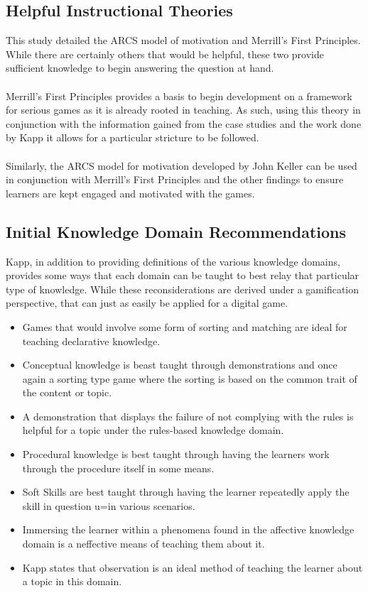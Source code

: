 \documentclass[conference]{IEEEtran}
\begin{document}
\subsection{Helpful Instructional Theories}
This study detailed the ARCS model of motivation and Merrill's First Principles. While there are certainly others that would be helpful, these two provide sufficient knowledge to begin answering the question at hand. 
\\\\
Merrill's First Principles\cite{Merrill2002} provides a basis to begin development on a framework for serious games as it is already rooted in teaching. As such, using this theory in conjunction with the information gained from the case studies and the work done by Kapp\cite{Kapp2012a} it allows for a particular stricture to be followed.
\\\\
Similarly, the ARCS model for motivation developed by John Keller\cite{keller1987development} can be used in conjunction with Merrill's First Principles and the other findings to ensure learners are kept engaged and motivated with the games.

\subsection{Initial Knowledge Domain Recommendations}
Kapp\cite{Kapp2012a}, in addition to providing definitions of the various knowledge domains, provides some ways that each domain can be taught to best relay that particular type of knowledge. While these reconsiderations are derived under a gamification perspective, that can just as easily be applied for a digital game.

\begin{itemize}
\item
Games that would involve some form of sorting and matching are ideal for teaching declarative knowledge\cite{Kapp2012a}.
\item
Conceptual knowledge is beast taught through demonstrations and once again a sorting type game where the sorting is based on the common trait of the content or topic\cite{Kapp2012a}.
\item
A demonstration that displays the failure of not complying with the rules is helpful for a topic under the rules-based knowledge domain\cite{Kapp2012a}.
\item
Procedural knowledge is best taught through having the learners work through the procedure itself in some means\cite{Kapp2012a}.
\item
Soft Skills are best taught through having the learner repeatedly apply the skill in question u=in various scenarios\cite{Kapp2012a}.
\item
Immersing the learner within a phenomena found in the affective knowledge domain is a neffective means of teaching them about it\cite{Kapp2012a}.
\item
Kapp\cite{Kapp2012a} states that observation is an ideal method of teaching the learner about a topic in this domain.
\end{itemize}
\end{document}
